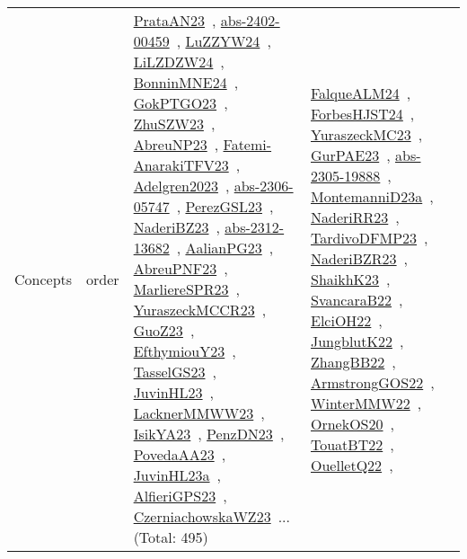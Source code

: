 {\begin{longtable}{lp{3cm}>{\raggedright\arraybackslash}p{6cm}>{\raggedright\arraybackslash}p{6cm}>{\raggedright\arraybackslash}p{8cm}}
Concepts & order & \href{../works/PrataAN23.pdf}{PrataAN23}~\cite{PrataAN23}, \href{../works/abs-2402-00459.pdf}{abs-2402-00459}~\cite{abs-2402-00459}, \href{../works/LuZZYW24.pdf}{LuZZYW24}~\cite{LuZZYW24}, \href{../works/LiLZDZW24.pdf}{LiLZDZW24}~\cite{LiLZDZW24}, \href{../works/BonninMNE24.pdf}{BonninMNE24}~\cite{BonninMNE24}, \href{../works/GokPTGO23.pdf}{GokPTGO23}~\cite{GokPTGO23}, \href{../works/ZhuSZW23.pdf}{ZhuSZW23}~\cite{ZhuSZW23}, \href{../works/AbreuNP23.pdf}{AbreuNP23}~\cite{AbreuNP23}, \href{../works/Fatemi-AnarakiTFV23.pdf}{Fatemi-AnarakiTFV23}~\cite{Fatemi-AnarakiTFV23}, \href{../works/Adelgren2023.pdf}{Adelgren2023}~\cite{Adelgren2023}, \href{../works/abs-2306-05747.pdf}{abs-2306-05747}~\cite{abs-2306-05747}, \href{../works/PerezGSL23.pdf}{PerezGSL23}~\cite{PerezGSL23}, \href{../works/NaderiBZ23.pdf}{NaderiBZ23}~\cite{NaderiBZ23}, \href{../works/abs-2312-13682.pdf}{abs-2312-13682}~\cite{abs-2312-13682}, \href{../works/AalianPG23.pdf}{AalianPG23}~\cite{AalianPG23}, \href{../works/AbreuPNF23.pdf}{AbreuPNF23}~\cite{AbreuPNF23}, \href{../works/MarliereSPR23.pdf}{MarliereSPR23}~\cite{MarliereSPR23}, \href{../works/YuraszeckMCCR23.pdf}{YuraszeckMCCR23}~\cite{YuraszeckMCCR23}, \href{../works/GuoZ23.pdf}{GuoZ23}~\cite{GuoZ23}, \href{../works/EfthymiouY23.pdf}{EfthymiouY23}~\cite{EfthymiouY23}, \href{../works/TasselGS23.pdf}{TasselGS23}~\cite{TasselGS23}, \href{../works/JuvinHL23.pdf}{JuvinHL23}~\cite{JuvinHL23}, \href{../works/LacknerMMWW23.pdf}{LacknerMMWW23}~\cite{LacknerMMWW23}, \href{../works/IsikYA23.pdf}{IsikYA23}~\cite{IsikYA23}, \href{../works/PenzDN23.pdf}{PenzDN23}~\cite{PenzDN23}, \href{../works/PovedaAA23.pdf}{PovedaAA23}~\cite{PovedaAA23}, \href{../works/JuvinHL23a.pdf}{JuvinHL23a}~\cite{JuvinHL23a}, \href{../works/AlfieriGPS23.pdf}{AlfieriGPS23}~\cite{AlfieriGPS23}, \href{../works/CzerniachowskaWZ23.pdf}{CzerniachowskaWZ23}~\cite{CzerniachowskaWZ23}... (Total: 495) & \href{../works/FalqueALM24.pdf}{FalqueALM24}~\cite{FalqueALM24}, \href{../works/ForbesHJST24.pdf}{ForbesHJST24}~\cite{ForbesHJST24}, \href{../works/YuraszeckMC23.pdf}{YuraszeckMC23}~\cite{YuraszeckMC23}, \href{../works/GurPAE23.pdf}{GurPAE23}~\cite{GurPAE23}, \href{../works/abs-2305-19888.pdf}{abs-2305-19888}~\cite{abs-2305-19888}, \href{../works/MontemanniD23a.pdf}{MontemanniD23a}~\cite{MontemanniD23a}, \href{../works/NaderiRR23.pdf}{NaderiRR23}~\cite{NaderiRR23}, \href{../works/TardivoDFMP23.pdf}{TardivoDFMP23}~\cite{TardivoDFMP23}, \href{../works/NaderiBZR23.pdf}{NaderiBZR23}~\cite{NaderiBZR23}, \href{../works/ShaikhK23.pdf}{ShaikhK23}~\cite{ShaikhK23}, \href{../works/SvancaraB22.pdf}{SvancaraB22}~\cite{SvancaraB22}, \href{../works/ElciOH22.pdf}{ElciOH22}~\cite{ElciOH22}, \href{../works/JungblutK22.pdf}{JungblutK22}~\cite{JungblutK22}, \href{../works/ZhangBB22.pdf}{ZhangBB22}~\cite{ZhangBB22}, \href{../works/ArmstrongGOS22.pdf}{ArmstrongGOS22}~\cite{ArmstrongGOS22}, \href{../works/WinterMMW22.pdf}{WinterMMW22}~\cite{WinterMMW22}, \href{../works/OrnekOS20.pdf}{OrnekOS20}~\cite{OrnekOS20}, \href{../works/TouatBT22.pdf}{TouatBT22}~\cite{TouatBT22}, \href{../works/OuelletQ22.pdf}{OuelletQ22}~\cite{OuelletQ22}, 
\end{longtable}}
